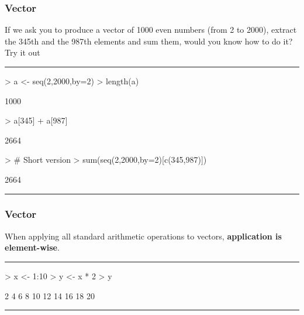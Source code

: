 \documentclass{beamer}
\begin{document}
\begin{frame}[fragile]
	\frametitle{Vector}
	If we ask you to produce a vector of 1000 even numbers (from 2 to 2000), extract the 345th and the 987th elements and sum them, would you know how to do it?\\
	\centering Try it out
	\pause
		\rule{\textwidth}{0.4pt}
\begin{Schunk}
\begin{Sinput}
> a <- seq(2,2000,by=2)
> length(a)
\end{Sinput}
\begin{Soutput}
[1] 1000
\end{Soutput}
\begin{Sinput}
> a[345] + a[987]
\end{Sinput}
\begin{Soutput}
[1] 2664
\end{Soutput}
\begin{Sinput}
> # Short version
> sum(seq(2,2000,by=2)[c(345,987)])
\end{Sinput}
\begin{Soutput}
[1] 2664
\end{Soutput}
\end{Schunk}
  \rule{\textwidth}{0.4pt}
\end{frame}

\begin{frame}[fragile]
	\frametitle{Vector}
	When applying all standard arithmetic operations to vectors, \textbf{application is element-wise}.\\
\rule{\textwidth}{0.4pt}
\begin{Schunk}
\begin{Sinput}
> x <- 1:10
> y <- x * 2
> y
\end{Sinput}
\begin{Soutput}
 [1]  2  4  6  8 10 12 14 16 18 20
\end{Soutput}
\end{Schunk}
  \rule{\textwidth}{0.4pt}
\end{frame}
\end{document}
